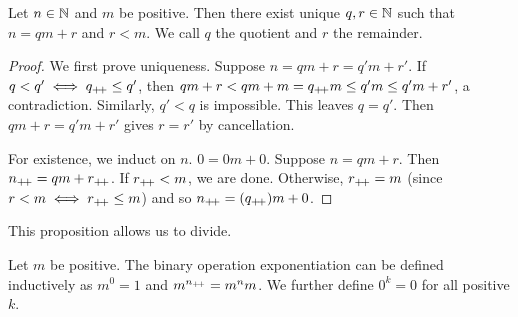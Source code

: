 \begin{proposition*} \label{thm:euclidean_algorithm}
    Let $n \in \mathbb{N}$ and $m$ be positive.
    Then there exist unique $q, r \in \mathbb{N}$ such that $n = qm + r$ and $r < m$.
    We call $q$ the quotient and $r$ the remainder.
\end{proposition*}
\begin{proof}
    We first prove uniqueness.
    Suppose $n = qm + r = q'm + r'$.
    If $q < q' \iff q_{+\!+} \le q'$, then $qm + r < qm + m = q_{+\!+} m \le q'm
    \le q'm + r'$, a contradiction.
    Similarly, $q' < q$ is impossible.
    This leaves $q = q'$.
    Then $qm + r = q'm + r'$ gives $r = r'$ by cancellation.

    For existence, we induct on $n$.
    $0 = 0m + 0$.
    Suppose $n = qm + r$.
    Then $n_{+\!+} = qm + r_{+\!+}$.
    If $r_{+\!+} < m$, we are done.
    Otherwise, $r_{+\!+} = m$ (since $r < m \iff r_{+\!+} \le m$) and so
    $n_{+\!+} = (q_{+\!+})m + 0$.
\end{proof}
This proposition allows us to divide.

\begin{definition*}[Exponentiation] \label{def:exponentiation}
    Let $m$ be positive.
    The binary operation exponentiation can be defined inductively as
    $m ^ 0 = 1$ and $m ^ {n_{+\!+}} = m ^ n m$.
    We further define $0 ^ k = 0$ for all positive $k$.
\end{definition*}

